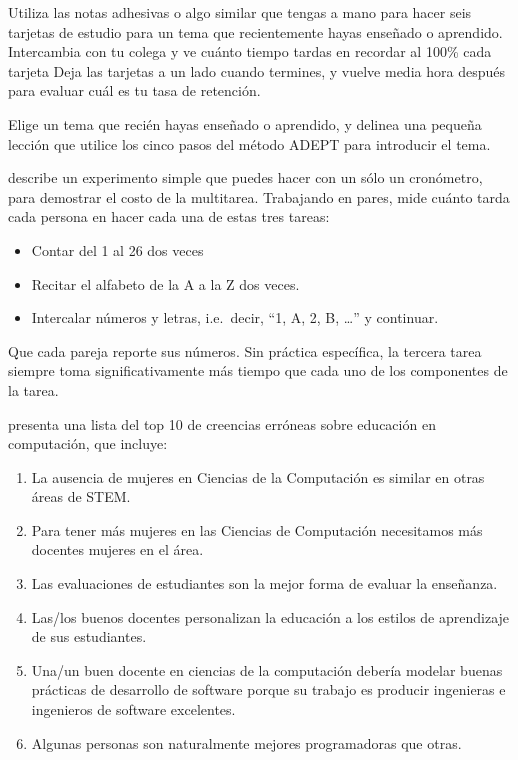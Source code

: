 
Utiliza las notas adhesivas o algo similar que tengas a mano
para hacer seis tarjetas de estudio
para un tema que recientemente hayas enseñado o aprendido.
Intercambia con tu colega y ve cuánto tiempo tardas en recordar
al 100\% cada tarjeta
Deja las tarjetas a un lado cuando termines,
y vuelve media hora después para evaluar cuál es tu tasa de retención.


Elige un tema que recién hayas enseñado o aprendido,
y delinea una pequeña lección que utilice los cinco pasos del método ADEPT para introducir el tema.


describe un experimento simple que puedes hacer con un sólo un cronómetro,
para demostrar el costo de la multitarea.
Trabajando en pares,
mide cuánto tarda cada persona en hacer cada una de estas tres tareas:

\begin{itemize}
\item
  Contar del 1 al 26 dos veces
\item
  Recitar el alfabeto de la A a la Z dos veces.
\item
  Intercalar números y letras,
  i.e.\ decir, ``1, A, 2, B, {\ldots}''
  y continuar.
\end{itemize}

Que cada pareja reporte sus números.
Sin práctica específica,
la tercera tarea siempre toma significativamente más tiempo que cada uno de los componentes de la tarea.


\cite{Guzd2015b} presenta una lista del top 10 de creencias erróneas sobre educación en computación,
que incluye:

\begin{enumerate}
\item
  La ausencia de mujeres en Ciencias de la Computación es similar en otras áreas de STEM.
\item
  Para tener más mujeres en las Ciencias de Computación necesitamos más docentes mujeres en el área.
\item
  Las evaluaciones de estudiantes son la mejor forma de evaluar la enseñanza.
\item
  Las/los buenos docentes personalizan la educación a los estilos de aprendizaje de sus estudiantes.
\item
  Una/un buen docente en ciencias de la computación debería modelar buenas prácticas de desarrollo de software porque su trabajo es producir ingenieras e ingenieros de software excelentes.
\item
  Algunas personas son naturalmente mejores programadoras que otras.
\end{enumerate}

